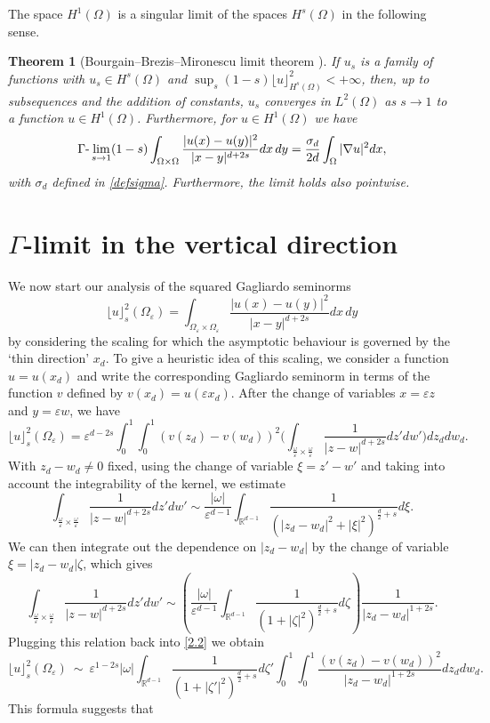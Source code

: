 \documentclass[11pt]{article}
\newtheorem{theorem}[definition]{Theorem}
\def\e{\varepsilon}
\begin{document}
\smallskip
The space $H^1(\Omega)$ is a singular limit of the spaces $H^s(\Omega)$ in the following sense.
\begin{theorem}[Bourgain--Brezis--Mironescu limit theorem \cite{BBM,ponce}]\label{BBM-thm}
If $u_s$ is a family of functions with $u_s\in H^s(\Omega)$ and $\sup_s(1-s)\lfloor u\rfloor^2_{H^s(\Omega)}<+\infty$,
then, up to subsequences and the addition of constants, $u_s$ converges in $L^2(\Omega)$ as $s\to 1$ to a function $u\in H^1(\Omega)$. Furthermore, for $u\in H^1(\Omega)$ we have
$$
\Gamma\hbox{-}\lim_{s\to 1} (1-s)\int_{\Omega\times \Omega} \frac{|u(x)-u(y)|^2}{|x-y|^{d+2s}} dx\,dy=\frac{\sigma_d}{2d}\int_\Omega|\nabla u|^2dx,
$$
with $\sigma_d$ defined in \eqref{defsigma}. Furthermore, the limit holds also pointwise.
\end{theorem}

\section{\bf $\Gamma$-limit in the vertical direction} \label{asymp2}

We now start our analysis of the squared Gagliardo seminorms 
$$
\lfloor u
\rfloor^2_s(\Omega_\e)=\int_{\Omega_\e\times \Omega_\e} \frac{|u(x)-u(y)|^2}{|x-y|^{d+2s}} dx\,dy
$$
by considering the scaling for which the asymptotic behaviour is governed by the `thin direction' $x_d$. To give a heuristic idea of this scaling, 
we consider a function $u=u(x_d)$ and write the corresponding Gagliardo seminorm in terms of the function $v$ defined by $v(x_d)=u(\e x_d)$. After the change of variables $x=\e z$ and $y=\e w$, we have
\begin{equation}\label{2.2}
\lfloor u\rfloor_s^2(\Omega_\e)=\e^{d-2s}
\int_0^1\int_0^1(v(z_d)-v(w_d))^2\Big(\int_{\frac\omega\e\times\frac\omega\e}\frac{1}{|z-w|^{d+2s}}dz' dw'\Big)dz_d dw_d. 
\end{equation}
With $z_d-w_d\neq 0$ fixed, using the change of variable $\xi=z'-w'$ and taking into account the integrability of the kernel, we estimate
$$
\int_{\frac\omega\e\times\frac\omega\e}\frac{1}{|z-w|^{d+2s}}dz' dw'\sim \frac{|\omega|}{\e^{d-1}}\int_{\mathbb R^{d-1}}\frac{1}{(|z_d-w_d|^2+ |\xi|^2)^{\frac d2+s}}d\xi.
$$
We can then integrate out the dependence on $|z_d-w_d|$ by the change of variable $\xi=|z_d-w_d|\zeta$, which gives 
\[
\int_{\frac\omega\e\times\frac\omega\e}\frac{1}{|z-w|^{d+2s}}dz' dw'
\sim \left(\frac{|\omega|}{\e^{d-1}}\int_{\mathbb R^{d-1}}\frac1{(1+ |\zeta|^2)^{\frac d2+s}}d\zeta\right) \frac1{|z_d-w_d|^{1+2s}}.
\]
Plugging this relation back into \eqref{2.2} we obtain
\begin{equation}\label{2.3}
\lfloor u\rfloor_s^2(\Omega_\e)\ \sim\ \e^{1-2s}|\omega|\int_{\mathbb R^{d-1}}\frac1{(1+ |\zeta'|^2)^{\frac d2+s}}d\zeta'
\int_0^1\int_0^1\frac{(v(z_d)-v(w_d))^2}{|z_d-w_d|^{1+2s}}dz_d dw_d. 
\end{equation}
This formula suggests that
\end{document}

